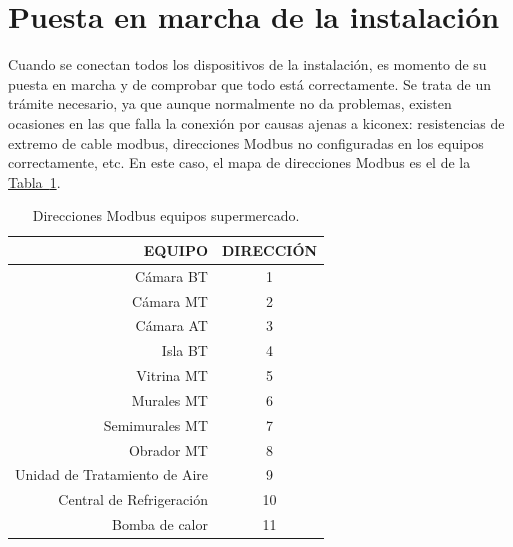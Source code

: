 \section{Puesta en marcha de la instalación}
\label{sec:altaInstalación}

Cuando se conectan todos los dispositivos de la instalación, es momento de su puesta en marcha y de comprobar que todo está correctamente. Se trata de un trámite necesario, ya que aunque normalmente no da problemas, existen ocasiones en las que falla la conexión por causas ajenas a kiconex: resistencias de extremo de cable modbus, direcciones Modbus no configuradas en los equipos correctamente, etc. En este caso, el mapa de direcciones Modbus es el de la \hyperref[tab:direccionesModbus]{Tabla~\ref{tab:direccionesModbus}}.

\vspace*{\fill}

\begin{table}[H]
  \begin{center}
    \setlength\arrayrulewidth{2pt}
    \begin{tabular}{| r | c |}
      \hhline{|*{2}{-}}
      \cellcolor{lightgray}\textbf{\footnotesize{EQUIPO}} & \cellcolor{lightgray}\textbf{\footnotesize{DIRECCIÓN}}\\ \hline
      \footnotesize{Cámara BT} & 1 \\ \hline
      \footnotesize{Cámara MT} & 2 \\ \hline
      \footnotesize{Cámara AT} & 3 \\ \hline
      \footnotesize{Isla BT} & 4 \\ \hline
      \footnotesize{Vitrina MT} & 5 \\ \hline
      \footnotesize{Murales MT} & 6 \\ \hline
      \footnotesize{Semimurales MT} & 7 \\ \hline
      \footnotesize{Obrador MT} & 8 \\ \hline
      \footnotesize{Unidad de Tratamiento de Aire} & 9 \\ \hline
      \footnotesize{Central de Refrigeración} & 10 \\ \hline
      \footnotesize{Bomba de calor} & 11 \\ \hline
    \end{tabular}
    \caption{Direcciones Modbus equipos supermercado.}
    \label{tab:direccionesModbus}
  \end{center}
\end{table} 

